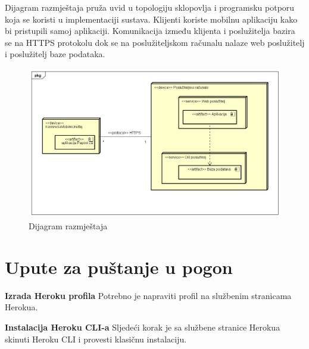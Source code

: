 			Dijagram razmještaja pruža uvid u topologiju sklopovlja i programsku potporu koja se
			koristi u implementaciji sustava. Klijenti koriste mobilnu aplikaciju kako bi pristupili samoj aplikaciji. Komunikacija između klijenta i poslužitelja bazira se na HTTPS protokolu dok se na poslužiteljskom 
			računalu nalaze web poslužitelj i poslužitelj baze podataka.
			\\
			 \begin{figure}[H]				\includegraphics[scale=0.55]{dijagrami/dij_razmjestaj.PNG} 
				\centering
				\caption{Dijagram razmještaja}
				\label{fig:dij_ramjestaj}%
			\end{figure}
			
			\eject 
		
		\section{Upute za puštanje u pogon}
			
			\vspace{5mm}
			\noindent \textbf{Izrada Heroku profila}\newline
			Potrebno je napraviti profil na službenim stranicama Herokua.
			
			\vspace{5mm}
			\noindent \textbf{Instalacija Heroku CLI-a}\newline
			Sljedeći korak je sa službene stranice Herokua skinuti Heroku CLI i provesti klasičnu instalaciju.
			
